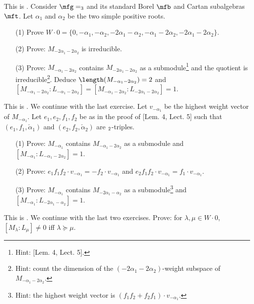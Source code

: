 	\begin{exe}
		This is . Consider $\mfg = \sl_3$ and its standard Borel $\mfb$ and Cartan subalgebras $\mft$. Let $\alpha_1$ and $\alpha_2$ be the two simple positive roots.
		\begin{itemize}
			\item[(1)]
				Prove $W\cdot 0 = \{ 0, -\alpha_1,-\alpha_2,-2\alpha_1-\alpha_2,-\alpha_1-2\alpha_2, -2\alpha_1-2\alpha_2 \}$.
			\item[(2)]
				Prove: $M_{-2\alpha_1-2\alpha_2}$ is irreducible.
			\item[(3)]
				Prove: $M_{-\alpha_1-2\alpha_2}$ contains $M_{-2\alpha_1-2\alpha_2}$ as a submodule\footnote{Hint: [Lem. 4, Lect. 5].} and the quotient is irreducible\footnote{Hint: count the dimension of the $(-2\alpha_1-2\alpha_2)$-weight subspace of $M_{-\alpha_1-2\alpha_2}$.}. Deduce $\length(M_{-\alpha_1-2\alpha_2})=2$ and $[M_{-\alpha_1-2\alpha_2}: L_{-\alpha_1-2\alpha_2}] = [M_{-\alpha_1-2\alpha_2}: L_{-2\alpha_1-2\alpha_2}] = 1$.
		\end{itemize}
	\end{exe}

	\begin{exe}
		This is . We continue with the last exercise. Let $v_{-\alpha_1}$ be the highest weight vector of $M_{-\alpha_1}$. Let $e_1,e_2,f_1,f_2$ be as in the proof of [Lem. 4, Lect. 5] such that $(e_1,f_1,\check \alpha_1)$ and $(e_2,f_2,\check \alpha_2)$ are $\sl_2$-triples. 
		\begin{itemize}
			\item[(1)]
				Prove: $M_{-\alpha_1}$ contains $M_{-\alpha_1-2\alpha_2}$ as a submodule and $[M_{-\alpha_1}: L_{-\alpha_1-2\alpha_2}] = 1$.
			\item[(2)]
				Prove: $e_1 f_1 f_2 \cdot v_{-\alpha_1} = -f_2 \cdot v_{-\alpha_1}$ and $e_2 f_1 f_2 \cdot v_{-\alpha_1} = f_1 \cdot v_{-\alpha_1}$.
			\item[(3)]
				Prove: $M_{-\alpha_1}$ contains $M_{-2\alpha_1-\alpha_2}$ as a submodule\footnote{Hint: the highest weight vector is $(f_1f_2+f_2f_1)\cdot v_{-\alpha_1}$.} and $[M_{-\alpha_1}: L_{-2\alpha_1-\alpha_2}] = 1$.
			
		\end{itemize}
	\end{exe}

	\begin{exe}
		This is . We continue with the last two exercises. Prove: for $\lambda,\mu \in W\cdot 0$, $[M_\lambda: L_\mu] \neq 0$ iff $\lambda \succeq \mu$.
	\end{exe}



